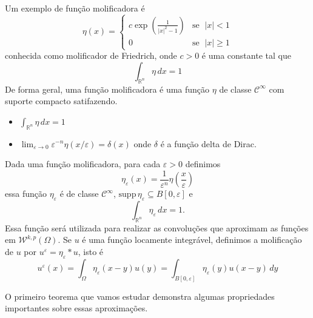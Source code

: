 \documentclass[a4paper, 11pt]{book}
\theoremstyle{definition}
\newcommand{\bR}{\mathbb{R}}
\newcommand{\cC}{\mathcal{C}}
\newcommand{\cW}{\mathcal{W}}
\newcommand{\supp}{\mathrm{supp}\,}
\begin{document}
Um exemplo de função molificadora é
\begin{equation} \label{eq:molificador-friedrich}
    \eta(x) =
    \left\{
        \begin{array}{lr}
            c \exp \left( \frac{1}{|x|^2 - 1} \right) & \text{se }\; |x| < 1\\
            0 & \text{se }\; |x| \geqslant 1
        \end{array}
    \right.
\end{equation}
conhecida como molificador de Friedrich, onde $c > 0$ é uma constante tal que
\[
    \int_{\bR^n} \eta \,dx = 1
\]
De forma geral, uma função molificadora é uma função $\eta$ de classe $\cC^\infty$ com suporte compacto satifazendo. 
\begin{itemize}[leftmargin=*, label=\textbf{--}]
    \item $\displaystyle \int_{\bR^n} \eta \,dx = 1$
    \item $\displaystyle \lim_{\varepsilon \to 0} \varepsilon^{-n}\eta(x/\varepsilon) = \delta(x)$ onde $\delta$ é a função delta de Dirac.
\end{itemize}
Dada uma função molificadora, para cada $\varepsilon > 0$ definimos
\begin{equation} \label{eq:eta-epsilon}
    \eta_\varepsilon(x) = \frac{1}{\varepsilon^n} \eta\left( \frac{x}{\varepsilon} \right)
\end{equation}
essa função $\eta_\varepsilon$ é de classe $\cC^\infty$, $\supp \eta_\varepsilon \subseteq B[0,\varepsilon]$ e
\[
    \int_{\bR^n} \eta_\varepsilon \,dx = 1.
\]
Essa função será utilizada para realizar as convoluções que aproximam as funções em $\cW^{k,p}(\Omega)$. Se $u$ é uma função locamente integrável, definimos a molificação de $u$ por $u^\varepsilon = \eta_\varepsilon * u$, isto é
\[
    u^\varepsilon(x) = \int_\Omega \eta_\varepsilon(x-y) u(y) = \int_{B[0,\varepsilon]} \eta_\varepsilon(y) u(x-y) \,dy
\]

O primeiro teorema que vamos estudar demonstra algumas propriedades importantes sobre essas aproximações.
\end{document}
